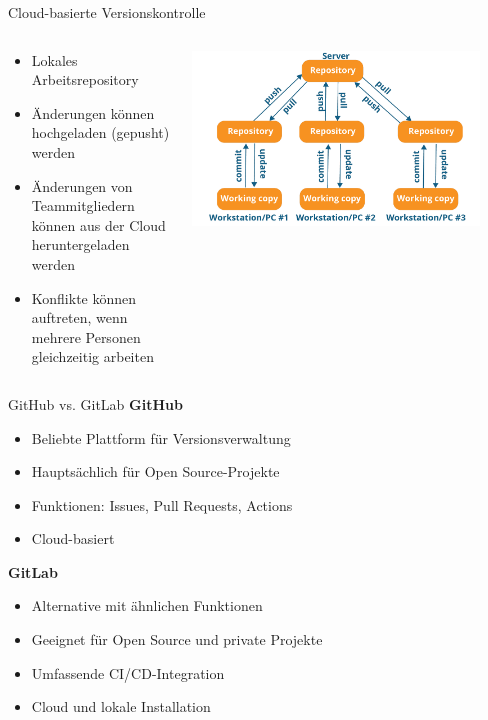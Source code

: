\documentclass[compress,aspectratio=169]{beamer}
\begin{document}
	\begin{frame}{Cloud-basierte Versionskontrolle}
		\begin{columns}
			\begin{column}{0.6\textwidth}
				\begin{itemize}
						\item Lokales Arbeitsrepository
						\item Änderungen können hochgeladen (gepusht) werden
						\item Änderungen von Teammitgliedern können aus der Cloud heruntergeladen werden
						\item Konflikte können auftreten, wenn mehrere Personen gleichzeitig arbeiten
				\end{itemize}
			\end{column}
			\begin{column}{0.4\textwidth}
				\begin{center}
					\includegraphics[width=0.9\textwidth]{assets/version-control.png}
				\end{center}
			\end{column}
		\end{columns}
	\end{frame}
	
	\begin{frame}{GitHub vs. GitLab}
		\textbf{GitHub}
		\begin{itemize}
			\item Beliebte Plattform für Versionsverwaltung
			\item Hauptsächlich für Open Source-Projekte
			\item Funktionen: Issues, Pull Requests, Actions
			\item Cloud-basiert
		\end{itemize}
		\vspace{1em}
		\textbf{GitLab}
		\begin{itemize}
			\item Alternative mit ähnlichen Funktionen
			\item Geeignet für Open Source und private Projekte
			\item Umfassende CI/CD-Integration
			\item Cloud und lokale Installation
		\end{itemize}
	\end{frame}			
		
\end{document}
